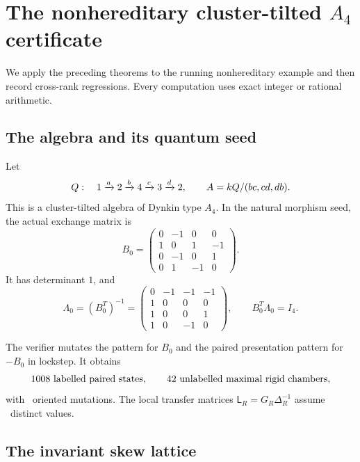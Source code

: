 \section{The nonhereditary cluster-tilted \texorpdfstring{$A_4$}{A4} certificate}
\label{sec:A4}

We apply the preceding theorems to the running nonhereditary example and then
record cross-rank regressions.  Every computation uses exact integer or
rational arithmetic.

\subsection{The algebra and its quantum seed}

Let
\begin{equation}
 Q:\quad
 1\xrightarrow a2\xrightarrow b4\xrightarrow c3\xrightarrow d2,
 \qquad
 A=k Q/(bc,cd,db).
 \label{eq:A4-algebra}
\end{equation}
This is a cluster-tilted algebra of Dynkin type $A_4$.  In the natural
morphism seed, the actual exchange matrix is
\begin{equation}
 B_0=
 \begin{pmatrix}
 0&-1&0&0\\
 1&0&1&-1\\
 0&-1&0&1\\
 0&1&-1&0
 \end{pmatrix}.
 \label{eq:A4-B0}
\end{equation}
It has determinant $1$, and
\begin{equation}
 \Lambda_0=(B_0^T)^{-1}
 =\begin{pmatrix}
 0&-1&-1&-1\\
 1&0&0&0\\
 1&0&0&1\\
 1&0&-1&0
 \end{pmatrix},
 \qquad
 B_0^T\Lambda_0=I_4.
 \label{eq:A4-Lambda0}
\end{equation}

The verifier mutates the pattern for $B_0$ and the paired presentation pattern
for $-B_0$ in lockstep.  It obtains
\[
 1008\text{ labelled paired states},
 \qquad
 42\text{ unlabelled maximal rigid chambers},
\]
with \AIVOrientedMutations\ oriented mutations.  The local transfer matrices
$\mathsf L_R=G_R\Delta_R^{-1}$ assume
\AIVTransferMatrices\ distinct values.

\subsection{The invariant skew lattice}

